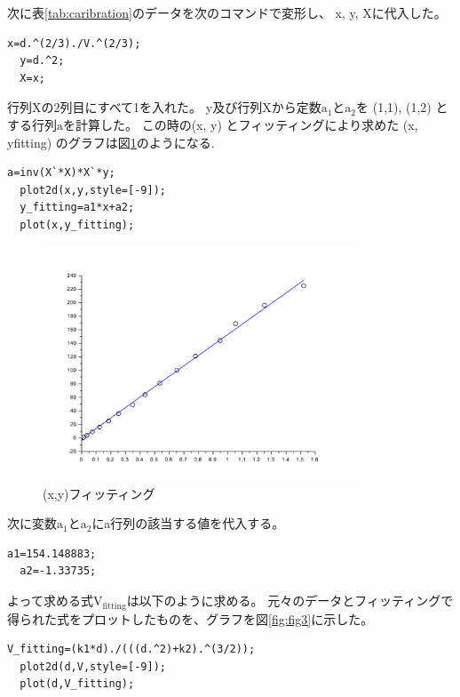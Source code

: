 \documentclass[11pt,a4j]{jsarticle}
\makeatletter
\newcommand{\figcaption}[1]{\def\@captype{figure}\caption{#1}}
\makeatother
\begin{document}
次に表\ref{tab:caribration}のデータを次のコマンドで変形し、
x, y, Xに代入した。

\begin{lstlisting}[basicstyle=\ttfamily\footnotesize, frame=single, framesep=0pt]
  x=d.^(2/3)./V.^(2/3);
  y=d.^2;
  X=x;
\end{lstlisting}

行列Xの2列目にすべて1を入れた。
y及び行列Xから定数$\mathrm{a_1}$と$\mathrm{a_2}$を (1,1), (1,2) とする行列$\mathrm{a}$を計算した。
この時の(x, y) とフィッティングにより求めた (x, yfitting) のグラフは図\ref{fig:fig2}のようになる.

\begin{lstlisting}[basicstyle=\ttfamily\footnotesize, frame=single, framesep=0pt]
  a=inv(X`*X)*X`*y;
  plot2d(x,y,style=[-9]);
  y_fitting=a1*x+a2;
  plot(x,y_fitting);
\end{lstlisting}


\begin{figure}[H]
  \centering
  \includegraphics[height=70mm,bb=0 0 610 480]{image/fig2.pdf}
  \figcaption{(x,y)フィッティング}
  \label{fig:fig2}
\end{figure}

次に変数$\mathrm{a_1}$と$\mathrm{a_2}$にa行列の該当する値を代入する。

\begin{lstlisting}[basicstyle=\ttfamily\footnotesize, frame=single, framesep=0pt]
  a1=154.148883;
  a2=-1.33735;
\end{lstlisting}

よって求める式$\mathrm{V_{fitting}}$は以下のように求める。
元々のデータとフィッティングで得られた式をプロットしたものを、グラフを図\ref{fig:fig3}に示した。

\begin{lstlisting}[basicstyle=\ttfamily\footnotesize, frame=single, framesep=0pt]
  V_fitting=(k1*d)./(((d.^2)+k2).^(3/2));
  plot2d(d,V,style=[-9]);
  plot(d,V_fitting);
\end{lstlisting}
\end{document}

